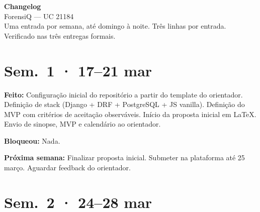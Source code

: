 \documentclass[a4paper,11pt]{article}
\newcommand{\semana}[2]{%
    \section{Sem.\ #1 · #2}%
}
\begin{document}

\begin{center}
    {\LARGE\bfseries Changelog}\\[0.6em]
    {\large ForensiQ --- UC 21184}\\[0.3em]
    {\small Uma entrada por semana, até domingo à noite.
    Três linhas por entrada. Verificado nas três entregas formais.}
\end{center}

\vspace{1em}

\semana{1}{17--21 mar}

\textbf{Feito:} Configuração inicial do repositório a partir do template do orientador.
Definição de stack (Django + DRF + PostgreSQL + JS vanilla). Definição do MVP com
critérios de aceitação observáveis. Início da proposta inicial em \LaTeX.
Envio de sinopse, MVP e calendário ao orientador.

\textbf{Bloqueou:} Nada.

\textbf{Próxima semana:} Finalizar proposta inicial. Submeter na plataforma até
25 março. Aguardar feedback do orientador.

\semana{2}{24--28 mar}
\end{document}
